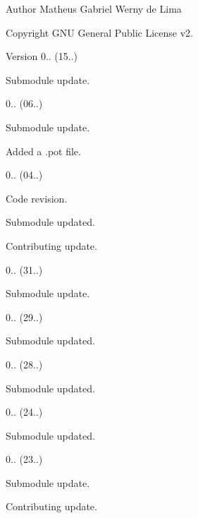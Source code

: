\begin{DoxyAuthor}{Author}
Matheus Gabriel Werny de Lima 
\end{DoxyAuthor}
\begin{DoxyCopyright}{Copyright}
G\+NU General Public License v2. 
\end{DoxyCopyright}
\begin{DoxyVersion}{Version}
0.. (15..)
\begin{DoxyItemize}
\item Submodule update. 
\end{DoxyItemize}

0.. (06..)
\begin{DoxyItemize}
\item Submodule update.
\item Added a .pot file. 
\end{DoxyItemize}

0.. (04..)
\begin{DoxyItemize}
\item Code revision.
\item Submodule updated.
\item Contributing update. 
\end{DoxyItemize}

0.. (31..)
\begin{DoxyItemize}
\item Submodule update. 
\end{DoxyItemize}

0.. (29..)
\begin{DoxyItemize}
\item Submodule updated. 
\end{DoxyItemize}

0.. (28..)
\begin{DoxyItemize}
\item Submodule updated. 
\end{DoxyItemize}

0.. (24..)
\begin{DoxyItemize}
\item Submodule updated. 
\end{DoxyItemize}

0.. (23..)
\begin{DoxyItemize}
\item Submodule update.
\item Contributing update. 
\end{DoxyItemize}


\end{DoxyVersion}
